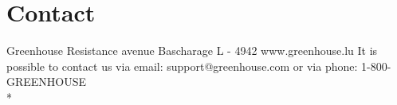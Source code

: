 \section{Contact}
Greenhouse Resistance avenue\newline
Bascharage L - 4942\newline
www.greenhouse.lu\newline
It is possible to contact us via email: support@greenhouse.com or via phone: 1-800-GREENHOUSE 
\\*